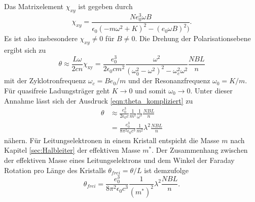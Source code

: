 \noindent
Das Matrixelement $\chi_{xy}$ ist gegeben durch 
\begin{equation*}
    \chi_{xy}=\frac{Ne_0^3\omega B}{\epsilon_0(-m\omega^2+K)^2-(e_0\omega B)^2)} .
\end{equation*}
Es ist also insbesondere $\chi_{xy}\neq 0$ für $B\neq 0$. Die Drehung der Polarisationsebene ergibt sich zu 
\begin{equation}
    \theta\approx\frac{L\omega}{2cn}\chi_\text{xy}=\frac{e_0^3}{2\epsilon_0 c m^2}\frac{\omega^2}{(\omega_0^2-\omega^2)^2-\omega_c^2\omega^2}\frac{NBL}{n}
    \label{eqn:theta_kompliziert}
\end{equation}
mit der Zyklotronfrequenz $\omega_c=Be_0/m$ und der Resonanzfrequenz $\omega_0=K/m$. 
Für quasifreie Ladungsträger geht $K\to0$ und somit $\omega_0\to 0$. Unter dieser Annahme lässt sich der Ausdruck 
\ref{eqn:theta_kompliziert} zu
\begin{align*}
    \theta&\approx\frac{e_0^3}{2\epsilon_0 c}\frac{1}{m^2}\frac{1}{\omega^2}\frac{NBL}{n}\\
    &=\frac{e_0^3}{8\pi^2\epsilon_0c^3}\frac{1}{m^2}\lambda^2\frac{NBL}{n}
\end{align*} 
nähern. Für Leitungselektronen in einem Kristall entspicht die Masse $m$ nach Kapitel \ref{sec:Halbleiter} der effektiven
Masse $m^*$. Der Zusammenhang zwischen der effektiven Masse eines Leitungselektrons und dem Winkel der Faraday Rotation pro
Länge des Kristalls $\theta_{frei}=\theta/L$ ist demzufolge
\begin{equation}
    \theta_{frei}=\frac{e_0^3}{8\pi^2\epsilon_0c^3}\frac{1}{(m^*)^2}\lambda^2\frac{NBL}{n}.
    \label{eqn:winkel_masse}
\end{equation}